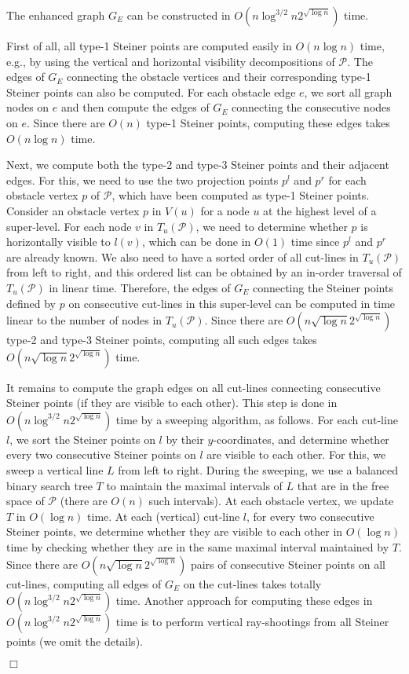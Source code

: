 \documentclass[english,runningheads,11pt]{llncs}
\def\calP{\mathcal{P}}
\newenvironment{proof}{\noindent {\textbf{Proof:}}\rm}{\hfill $\Box$\rm}
\begin{document}
\begin{lemma}\label{lem:10}
The enhanced graph $G_E$ can be constructed
in $O(n\log^{3/2}n2^{\sqrt{\log n}})$ time.
\end{lemma}
\begin{proof}
First of all, all type-1 Steiner points are
computed easily in $O(n\log n)$ time, e.g., by using the vertical and horizontal visibility decompositions of $\calP$. The edges of $G_E$ connecting the obstacle vertices and their
corresponding type-1 Steiner points can also be computed. For each obstacle
edge $e$, we sort all graph nodes on $e$ and then
compute the edges of $G_E$ connecting the consecutive nodes on $e$. Since
there are $O(n)$ type-1 Steiner points, computing these
edges takes $O(n\log n)$ time.

Next, we compute both the type-2 and type-3 Steiner points and their adjacent
edges. For this, we need to use the two projection
points $p^l$ and $p^r$ for each obstacle vertex $p$ of $\calP$, which have been computed as type-1 Steiner points.
Consider an obstacle vertex $p$ in $V(u)$ for a
node $u$ at the highest level of a super-level. For each node $v$ in
$T_u(\calP)$, we need to determine whether $p$ is horizontally
visible to $l(v)$, which can be done in $O(1)$ time since $p^l$
and $p^r$ are already known. We also need to have a sorted order of all
cut-lines in $T_u(\calP)$ from left to right, and this ordered list
can be obtained by an in-order traversal of $T_u(\calP)$ in linear
time. Therefore, the edges of $G_E$ connecting the Steiner points defined by $p$ on
consecutive cut-lines in this super-level can be computed in time linear to the number of nodes in $T_u(\calP)$.
Since there are $O(n\sqrt{\log n}2^{\sqrt{\log n}})$ type-2 and type-3
Steiner points, computing all such edges takes $O(n\sqrt{\log
n}2^{\sqrt{\log n}})$ time.

It remains to compute the graph edges on all cut-lines connecting consecutive Steiner
points (if they are visible to each other).
This step is done in $O(n\log^{3/2}n2^{\sqrt{\log n}})$ time by a
sweeping algorithm, as follows. For each cut-line $l$, we sort
the Steiner points on $l$ by their $y$-coordinates, and
determine whether every two consecutive Steiner points on $l$ are visible to
each other. For this, we sweep a vertical line $L$ from left to right.
During the sweeping, we use a balanced binary search tree $T$ to maintain
the maximal intervals of $L$ that are in the free space of $\calP$ (there are $O(n)$ such intervals).
At each obstacle vertex, we
update $T$ in $O(\log n)$ time. At each (vertical) cut-line $l$,
for every two consecutive Steiner points, we determine whether they
are visible to each other in $O(\log n)$ time by checking whether they
are in the same maximal interval maintained by $T$. Since
there are $O(n\sqrt{\log n}2^{\sqrt{\log n}})$ pairs of consecutive
Steiner points on all cut-lines, computing all edges of $G_E$ on the cut-lines takes
totally $O(n\log^{3/2}n2^{\sqrt{\log n}})$ time. Another
approach for computing these edges in $O(n\log^{3/2}n2^{\sqrt{\log
n}})$ time is to perform vertical ray-shootings from all Steiner
points (we omit the details).


\end{proof}
\end{document}
